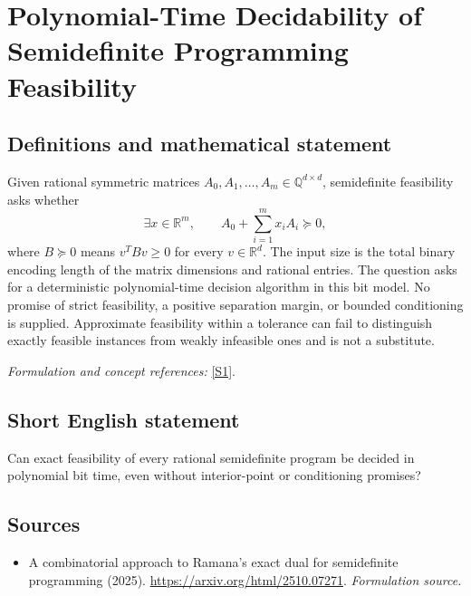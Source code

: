 \documentclass[11pt]{article}
\begin{document}
\section*{\texorpdfstring{Polynomial-Time Decidability of Semidefinite Programming Feasibility}{Polynomial-Time Decidability of Semidefinite Programming Feasibility}}\label{statement}
\subsection{Definitions and mathematical statement}
Given rational symmetric matrices $A_0,A_1,\ldots,A_m\in{\mathbb{Q}}^{d\times d}$, semidefinite feasibility asks whether
\[
 \exists x\in{\mathbb{R}}^m,\qquad A_0+\sum_{i=1}^m x_iA_i\succeq0,
\]
where $B\succeq0$ means $v^TBv\ge0$ for every $v\in{\mathbb{R}}^d$. The input size is the total binary encoding length of the matrix dimensions and rational entries. The question asks for a deterministic polynomial-time decision algorithm in this bit model. No promise of strict feasibility, a positive separation margin, or bounded conditioning is supplied. Approximate feasibility within a tolerance can fail to distinguish exactly feasible instances from weakly infeasible ones and is not a substitute.
\par\smallskip\textit{Formulation and concept references:} \href{https://arxiv.org/html/2510.07271}{[S1]}.

\subsection{Short English statement}
Can exact feasibility of every rational semidefinite program be decided in polynomial bit time, even without interior-point or conditioning promises?
\subsection{Sources}
\begin{itemize}
\item[S1]A combinatorial approach to Ramana's exact dual for semidefinite programming (2025).
\url{https://arxiv.org/html/2510.07271}.
\textit{Formulation source.}
\end{itemize}
\end{document}
